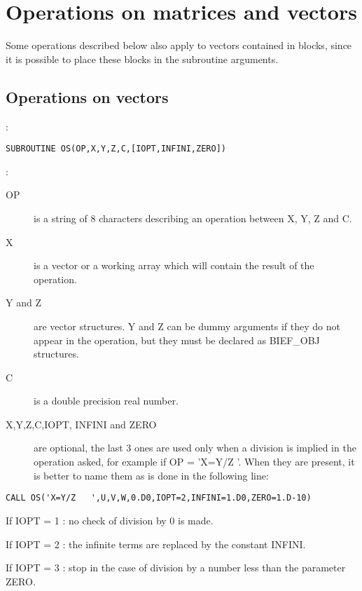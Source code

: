 \section{Operations on matrices and vectors}

Some operations described below also apply to vectors contained in blocks,
since it is possible to place these blocks in the subroutine arguments.

\subsection{Operations on vectors}

:
\begin{lstlisting}[language=TelFortran]
SUBROUTINE OS(OP,X,Y,Z,C,[IOPT,INFINI,ZERO])
\end{lstlisting}

:
\begin{description}
  \item [OP] is a string of 8 characters describing an operation between X, Y, Z
  and C.
  \item [X] is a vector or a working array which will contain the result of the
    operation.
  \item [Y and Z] are vector structures. Y and Z can be dummy arguments if they
    do not appear in the operation, but they must be declared as BIEF\_OBJ
    structures.

  \item [C] is a double precision real number.

  \item [X,Y,Z,C,IOPT, INFINI and ZERO] are optional, the last 3 ones are used
    only when a division is implied in the operation asked, for example if OP =
    'X=Y/Z   '. When they are present, it is better to name them as is done in
    the following line:
\end{description}

\begin{lstlisting}[language=TelFortran]
CALL OS('X=Y/Z   ',U,V,W,0.D0,IOPT=2,INFINI=1.D0,ZERO=1.D-10)
\end{lstlisting}

If IOPT = 1 : no check of division by 0 is made.

If IOPT = 2 : the infinite terms are replaced by the constant INFINI.

If IOPT = 3 : stop in the case of division by a number less than the parameter
ZERO.

